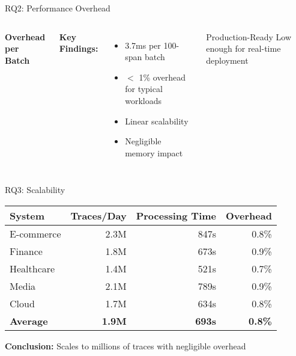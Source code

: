 \documentclass[aspectratio=169,xcolor=dvipsnames]{beamer}
\begin{document}
\begin{frame}{RQ2: Performance Overhead}
\begin{columns}[T]
\begin{center}
\textbf{Overhead per Batch}\\[1em]
\end{center}

\textbf{Key Findings:}
\begin{itemize}
    \item 3.7ms per 100-span batch
    \item $<$ 1\% overhead for typical workloads
    \item Linear scalability
    \item Negligible memory impact
\end{itemize}

\vspace{1em}
\begin{block}{Production-Ready}
Low enough for real-time deployment
\end{block}
\end{columns}
\end{frame}

\begin{frame}{RQ3: Scalability}
\begin{center}
\begin{tabular}{lrrr}
\toprule
\textbf{System} & \textbf{Traces/Day} & \textbf{Processing Time} & \textbf{Overhead} \\
\midrule
E-commerce & 2.3M & 847s & 0.8\% \\
Finance & 1.8M & 673s & 0.9\% \\
Healthcare & 1.4M & 521s & 0.7\% \\
Media & 2.1M & 789s & 0.9\% \\
Cloud & 1.7M & 634s & 0.8\% \\
\midrule
\textbf{Average} & \textbf{1.9M} & \textbf{693s} & \textbf{0.8\%} \\
\bottomrule
\end{tabular}
\end{center}

\vspace{1em}
\textbf{Conclusion:} Scales to millions of traces with negligible overhead
\end{frame}
\end{document}
